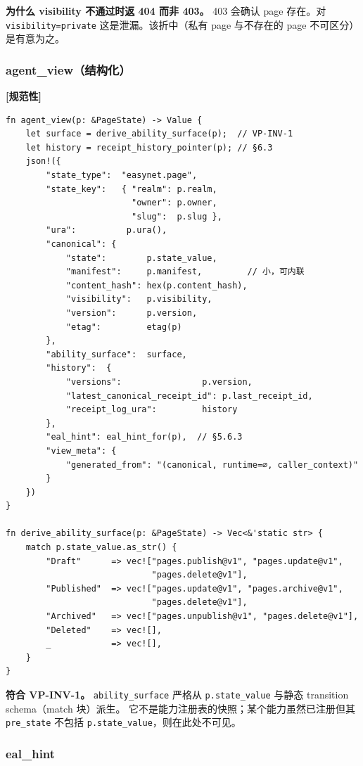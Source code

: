 \documentclass[11pt,a4paper]{article}
\newcommand{\normsv}{\textcolor{normativecolor}{\textbf{[规范性]}}\xspace}
\theoremstyle{definition}
\begin{document}
\textbf{为什么 visibility 不通过时返 404 而非 403。} 403 会确认 page
存在。对 \texttt{visibility=private} 这是泄漏。该折中（私有 page
与不存在的 page 不可区分）是有意为之。

\subsubsection{agent\_view（结构化）}

\normsv{}

\begin{lstlisting}
fn agent_view(p: &PageState) -> Value {
    let surface = derive_ability_surface(p);  // VP-INV-1
    let history = receipt_history_pointer(p); // §6.3
    json!({
        "state_type":  "easynet.page",
        "state_key":   { "realm": p.realm,
                         "owner": p.owner,
                         "slug":  p.slug },
        "ura":          p.ura(),
        "canonical": {
            "state":        p.state_value,
            "manifest":     p.manifest,         // 小，可内联
            "content_hash": hex(p.content_hash),
            "visibility":   p.visibility,
            "version":      p.version,
            "etag":         etag(p)
        },
        "ability_surface":  surface,
        "history":  {
            "versions":                p.version,
            "latest_canonical_receipt_id": p.last_receipt_id,
            "receipt_log_ura":         history
        },
        "eal_hint": eal_hint_for(p),  // §5.6.3
        "view_meta": {
            "generated_from": "(canonical, runtime=∅, caller_context)"
        }
    })
}

fn derive_ability_surface(p: &PageState) -> Vec<&'static str> {
    match p.state_value.as_str() {
        "Draft"      => vec!["pages.publish@v1", "pages.update@v1",
                             "pages.delete@v1"],
        "Published"  => vec!["pages.update@v1", "pages.archive@v1",
                             "pages.delete@v1"],
        "Archived"   => vec!["pages.unpublish@v1", "pages.delete@v1"],
        "Deleted"    => vec![],
        _            => vec![],
    }
}
\end{lstlisting}

\textbf{符合 VP-INV-1。} \texttt{ability\_surface} 严格从
\texttt{p.state\_value} 与静态 transition schema（match 块）派生。
它不是能力注册表的快照；某个能力虽然已注册但其 \texttt{pre\_state}
不包括 \texttt{p.state\_value}，则在此处不可见。

\subsubsection{eal\_hint}
\end{document}
